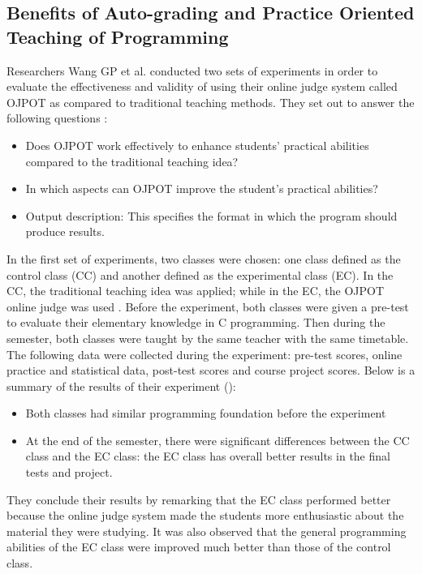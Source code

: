 \documentclass[12pt]{article}
\begin{document}
	\subsection{Benefits of Auto-grading and Practice Oriented Teaching of Programming}
		Researchers Wang GP et al. conducted two sets of experiments \cite{ojpot} in order to evaluate the effectiveness and validity of using their online judge system called OJPOT as compared to traditional teaching methods. They set out to answer the following questions \cite{ojpot}:
		\begin{itemize}
			\item  Does OJPOT work effectively to enhance students' practical abilities compared to the
					traditional teaching idea?
			\item  In which aspects can OJPOT improve the student's practical abilities?
			\item Output description: This specifies the format in which the program should produce results.
		\end{itemize}
		In the first set of experiments, two classes were chosen: one class defined as the control class (CC) and another defined as the experimental class (EC). In the CC, the traditional teaching idea was applied; while in the EC, the OJPOT online judge was used \cite{ojpot}. Before the experiment, both classes were given a pre-test to evaluate their elementary knowledge in C programming. Then during the semester, both classes were taught by the same teacher with the same timetable. The following data were collected during the experiment: pre-test scores, online practice and statistical data, post-test scores and course project scores. Below is a summary of the results of their experiment (\cite{ojpot}):
		\begin{itemize}
			\item Both classes had similar programming foundation before the experiment
			\item At the end of the semester, there were significant differences between the CC class and
				the EC class: the EC class has overall better results in the final tests and project.
		\end{itemize}
		They conclude their results by remarking that the EC class performed better because the online
	judge system made the students more enthusiastic about the material they were studying. It was
	also observed that the general programming abilities of the EC class were improved much better
	than those of the control class. 
	
\end{document}
